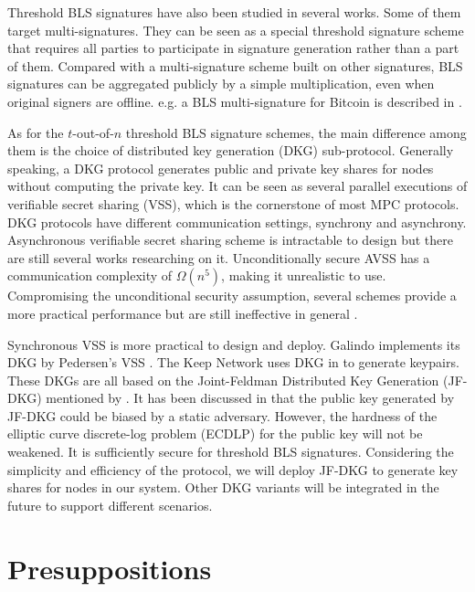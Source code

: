 \documentclass[11pt]{article}
\begin{document}
Threshold BLS signatures have also been studied in several works. Some of them target multi-signatures. They can be seen as a special threshold signature scheme that requires all parties to participate in signature generation rather than a part of them. Compared with a multi-signature scheme built on other signatures, BLS signatures can be aggregated publicly by a simple multiplication, even when original signers are offline. e.g. a BLS multi-signature for Bitcoin is described in \cite{boneh2018compact}. 

As for the $t$-out-of-$n$ threshold BLS signature schemes, the main difference among them is the choice of distributed key generation (DKG) sub-protocol. Generally speaking, a DKG protocol generates public and private key shares for nodes without computing the private key. It can be seen as several parallel executions of verifiable secret sharing (VSS), which is the cornerstone of most MPC protocols. DKG protocols have different communication settings, synchrony and asynchrony. Asynchronous verifiable secret sharing scheme is intractable to design but there are still several works researching on it. Unconditionally secure AVSS has a communication complexity of $\Omega(n^5)$, making it unrealistic to use. Compromising the unconditional security assumption, several schemes provide a more practical performance but are still ineffective in general \cite{kate2012distributed}.

Synchronous VSS is more practical to design and deploy. Galindo \cite{galindo2021fully} implements its DKG by Pedersen's VSS \cite{pedersen1991threshold}. The Keep Network \cite{keep2022doc} uses DKG in \cite{gennaro2007secure} to generate keypairs. These DKGs are all based on the Joint-Feldman Distributed Key Generation (JF-DKG) mentioned by \cite{pedersen1991non}. It has been discussed in \cite{gennaro2007secure} that the public key generated by JF-DKG could be biased by a static adversary. However, the hardness of the elliptic curve discrete-log problem (ECDLP) for the public key will not be weakened. It is sufficiently secure for threshold BLS signatures. Considering the simplicity and efficiency of the protocol, we will deploy JF-DKG to generate key shares for nodes in our system. Other DKG variants will be integrated in the future to support different scenarios.

\section{Presuppositions}
\end{document}
